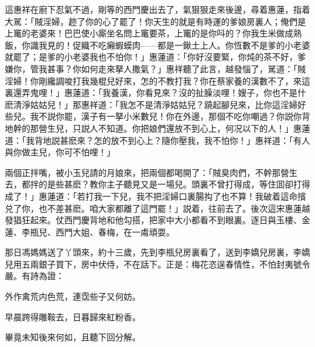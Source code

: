這惠祥在廚下忍氣不過，剛等的西門慶出去了，氣狠狠走來後邊，尋着惠蓮，指着大駡：「賊淫婦，趂了你的心了罷了！你天生的就是有時運的爹娘房裏人；俺們是上竃的老婆來！巴巴使小廝坐名問上竃要茶，上竃的是你呌的？你我生米做成熟飯，你識我見的！促織不吃癩蝦蟆肉——都是一鍬土上人。你恆數不是爹的小老婆就罷了；是爹的小老婆我也不怕你！」惠蓮道：「你好沒要緊，你炖的茶不好，爹嫌你，管我甚事？你如何走來拏人撒氣？」惠祥聽了此言，越發惱了，駡道：「賊淫婦！你剛纔調唆打我幾棍兒好來，怎的不教打我？你在蔡家養的漢數不了，來這裏還弄鬼哩！」惠蓮道：「我養漢，你看見來？沒的扯臊淡哩！嫂子，你也不是什麽清淨姑姑兒！」那惠祥道：「我怎不是清淨姑姑兒？蹺起腳兒來，比你這淫婦好些兒。我不説你罷，漢子有一拏小米數兒！你在外邊，那個不吃你嘲過？你説你背地幹的那營生兒，只説人不知道。你把娘們還放不到心上，何况以下的人！」惠蓮道：「我背地説甚麽來？怎的放不到心上？隨你壓我，我不怕你！」惠祥道：「有人與你做主兒，你可不怕哩！」

兩個正拌嘴，被小玉兒請的月娘來，把兩個都喝開了：「賊臭肉們，不幹那營生去，都拌的是些甚麽？教你主子聽見又是一場兒。頭裏不曾打得成，等住囬卻打得成了！」惠蓮道：「若打我一下兒，我不把淫婦口裏腸抅了也不算！我破着這命擯兑了你，也不差甚麽。咱大家都離了這門罷！」説着，往前去了。後次這宋惠蓮越發猖狂起來。仗西門慶背地和他勾搭，把家中大小都看不到眼裏。逐日與玉樓、金蓮、李瓶兒、西門大姐、春梅，在一䖏頑耍。

那日馮媽媽送了丫頭來，約十三歲，先到李瓶兒房裏看了，送到李嬌兒房裏，李嬌兒用五兩銀子買下，房中伏侍，不在話下。正是：梅花恣逞春情性，不怕封夷號令嚴。有詩為證：

\begin{myquote}
外作禽荒内色荒，連霑些子又何妨。

早晨跨得雕鞍去，日暮歸來紅粉香。
\end{myquote}

畢竟未知後來何如，且聽下回分解。

